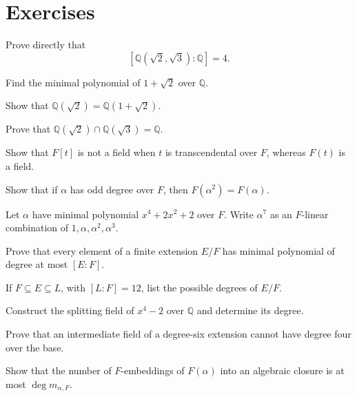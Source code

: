 \section*{Exercises}
\begin{exercise}[Basic] Prove directly that
\[
[\mathbb Q(\sqrt2,\sqrt3):\mathbb Q]=4.
\]
\end{exercise}
\begin{exercise}[Basic] Find the minimal polynomial of \(1+\sqrt2\) over
\(\mathbb Q\).
\end{exercise}
\begin{exercise}[Basic] Show that \(\mathbb Q(\sqrt2)=\mathbb Q(1+\sqrt2)\).
\end{exercise}
\begin{exercise}[Basic] Prove that \(\mathbb Q(\sqrt2)\cap\mathbb Q(\sqrt3)
=\mathbb Q\).
\end{exercise}
\begin{exercise}[Basic] Show that \(F[t]\) is not a field when \(t\) is
transcendental over \(F\), whereas \(F(t)\) is a field.
\end{exercise}
\begin{exercise}[Core] Show that if \(\alpha\) has odd degree over \(F\),
then \(F(\alpha^2)=F(\alpha)\).
\end{exercise}
\begin{exercise}[Core] Let \(\alpha\) have minimal polynomial
\(x^4+2x^2+2\) over \(F\).  Write \(\alpha^7\) as an \(F\)-linear combination
of \(1,\alpha,\alpha^2,\alpha^3\).
\end{exercise}
\begin{exercise}[Core] Prove that every element of a finite extension
\(E/F\) has minimal polynomial of degree at most \([E:F]\).
\end{exercise}
\begin{exercise}[Core] If \(F\subseteq E\subseteq L\), with
\([L:F]=12\), list the possible degrees of \(E/F\).
\end{exercise}
\begin{exercise}[Core] Construct the splitting field of \(x^4-2\) over
\(\mathbb Q\) and determine its degree.
\end{exercise}
\begin{exercise}[Core] Prove that an intermediate field of a degree-six
extension cannot have degree four over the base.
\end{exercise}
\begin{exercise}[Further] Show that the number of \(F\)-embeddings of
\(F(\alpha)\) into an algebraic closure is at most \(\deg m_{\alpha,F}\).
\end{exercise}
